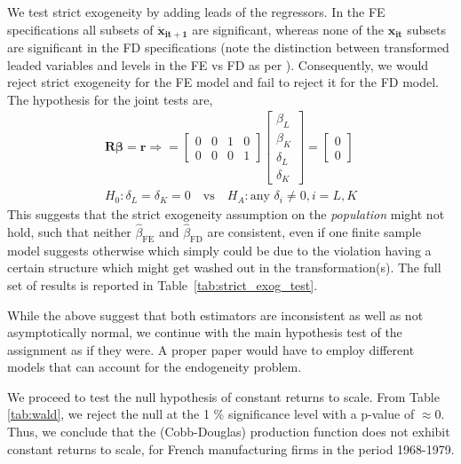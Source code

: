 We test strict exogeneity by adding leads of the regressors. In the FE specifications all subsets of $\bm{\ddot{x}_{it+1}}$ are significant, whereas none of the $\bm{x_{it}}$ subsets are significant in the FD specifications (note the distinction between transformed leaded variables and levels in the FE vs FD  as per \cite{wooldridgeEconometricAnalysisCross2010}). Consequently, we would reject strict exogeneity for the FE model and fail to reject it for the FD model. The hypothesis for the joint tests are, 
\begin{align*}
    \bm{R} \bm{\beta} = \bm{r} \Longrightarrow = \begin{bmatrix}
0 & 0 & 1 & 0 \\
0 & 0 & 0 & 1
\end{bmatrix} \begin{bmatrix}
\beta_L \\ \beta_K \\ \delta_{L} \\ \delta_{K}
\end{bmatrix} = \begin{bmatrix}
0 \\ 0
\end{bmatrix} \\
H_0: \delta_L = \delta_K = 0 \quad \text{vs} \quad H_A: \text{any } \delta_i \neq 0, i=L, K
\end{align*}
This suggests that the strict exogeneity assumption on the \textit{population} might not hold, such that neither $\hat{\beta}_{\text{FE}}$ and $\hat{\beta}_{\text{FD}}$ are consistent, even if one finite sample model suggests otherwise which simply could be due to the violation having a certain structure which might get washed out in the transformation(s). The full set of results is reported in Table~\ref{tab:strict_exog_test}. 



While the above suggest that both estimators are inconsistent as well as not asymptotically normal, we continue with the main hypothesis test of the assignment as if they were. A proper paper would have to employ different models that can account for the endogeneity problem. 

We proceed to test the null hypothesis of constant returns to scale. From Table \ref{tab:wald}, we reject the null at the 1 \% significance level with a p-value of $\approx 0$. Thus, we conclude that the (Cobb-Douglas) production function does not exhibit constant returns to scale, for French manufacturing firms in the period 1968-1979. 

